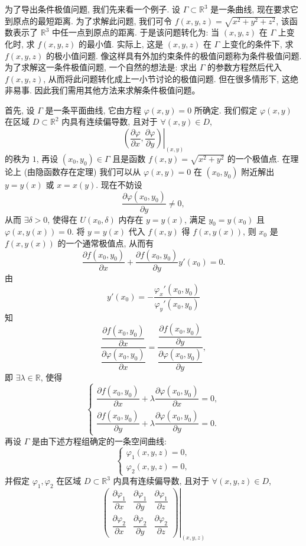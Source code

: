 \documentclass[UTF8, 12pt, fontset=fandol, oneside]{ctexart}
\begin{document}
为了导出条件极值问题, 我们先来看一个例子. 设 $\Gamma\subset\mathbb R^3$ 是一条曲线, 现在要求它到原点的最短距离. 为了求解此问题, 我们可令 $f(x,y,z)=\sqrt{x^2+y^2+z^2}$, 该函数表示了 $\mathbb R^3$ 中任一点到原点的距离. 于是该问题转化为: 当 $(x,y,z)$ 在 $\Gamma$ 上变化时, 求 $f(x,y,z)$ 的最小值. 实际上, 这是 $(x,y,z)$ 在 $\Gamma$ 上变化的条件下, 求 $f(x,y,z)$ 的极小值问题. 像这样具有外加约束条件的极值问题称为条件极值问题. 为了求解这一条件极值问题, 一个自然的想法是: 求出 $\Gamma$ 的参数方程然后代入 $f(x,y,z)$, 从而将此问题转化成上一小节讨论的极值问题. 但在很多情形下, 这绝非易事. 因此我们需用其他方法来求解条件极值问题。

首先, 设 $\Gamma$ 是一条平面曲线, 它由方程 $\varphi(x,y)=0$ 所确定. 我们假定 $\varphi(x,y)$ 在区域 $D\subset\mathbb R^2$ 内具有连续偏导数, 且对于 $\forall(x,y)\in D$,
\[
  \left.
  \left(\frac{\partial\varphi}{\partial x},\frac{\partial\varphi}{\partial y}\right)
  \right|_{(x,y)}
\]
的秩为 $1$, 再设 $(x_0,y_0)\in\Gamma$ 且是函数 $f(x,y)=\sqrt{x^2+y^2}$ 的一个极值点. 在理论上 (由隐函数存在定理) 我们可以从 $\varphi(x,y)=0$ 在 $(x_0,y_0)$ 附近解出 $y=y(x)$ 或 $x=x(y)$. 现在不妨设
\[
  \frac{\partial\varphi(x_0,y_0)}{\partial y}\ne0,
\]
从而 $\exists\delta>0$, 使得在 $U(x_0,\delta)$ 内存在 $y=y(x)$, 满足 $y_0=y(x_0)$ 且 $\varphi(x,y(x))=0$. 将 $y=y(x)$ 代入 $f(x,y)$ 得 $f(x,y(x))$, 则 $x_0$ 是 $f(x,y(x))$ 的一个通常极值点, 从而有
\[
  \frac{\partial f(x_0,y_0)}{\partial x}
  +
  \frac{\partial f(x_0,y_0)}{\partial y}y'(x_0)=0.
\]
由
\[
  y'(x_0)=-\frac{\varphi_x'(x_0,y_0)}{\varphi_y'(x_0,y_0)}
\]
知
\[
  \frac{\dfrac{\partial f(x_0,y_0)}{\partial x}}
       {\dfrac{\partial\varphi(x_0,y_0)}{\partial x}}
  =
  \frac{\dfrac{\partial f(x_0,y_0)}{\partial y}}
       {\dfrac{\partial\varphi(x_0,y_0)}{\partial y}},
\]
即 $\exists\lambda\in\mathbb R$, 使得
\[
  \begin{cases}
    \dfrac{\partial f(x_0,y_0)}{\partial x}
    +\lambda\dfrac{\partial\varphi(x_0,y_0)}{\partial x}=0,\\[1.2ex]
    \dfrac{\partial f(x_0,y_0)}{\partial y}
    +\lambda\dfrac{\partial\varphi(x_0,y_0)}{\partial y}=0.
  \end{cases}
\]
再设 $\Gamma$ 是由下述方程组确定的一条空间曲线:
\[
  \begin{cases}
    \varphi_1(x,y,z)=0,\\
    \varphi_2(x,y,z)=0,
  \end{cases}
\]
并假定 $\varphi_1,\varphi_2$ 在区域 $D\subset\mathbb R^3$ 内具有连续偏导数, 且对于 $\forall(x,y,z)\in D$,
\[
  \left.
  \begin{pmatrix}
    \dfrac{\partial\varphi_1}{\partial x} &
    \dfrac{\partial\varphi_1}{\partial y} &
    \dfrac{\partial\varphi_1}{\partial z}\\
    \dfrac{\partial\varphi_2}{\partial x} &
    \dfrac{\partial\varphi_2}{\partial y} &
    \dfrac{\partial\varphi_2}{\partial z}
  \end{pmatrix}
  \right|_{(x,y,z)}
\]
\end{document}
